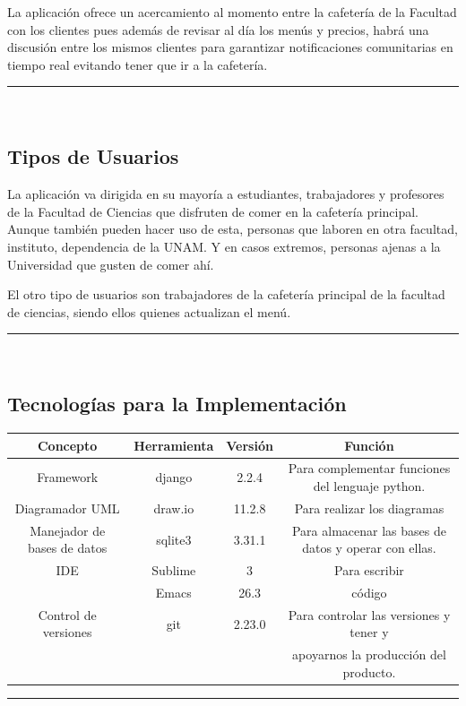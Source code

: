 \documentclass{article}
\begin{document}
La aplicación ofrece un acercamiento al momento entre la cafetería de la
Facultad con los clientes pues además de revisar al día los menús y precios,
habrá una discusión entre los mismos clientes para garantizar notificaciones
comunitarias en tiempo real evitando tener que ir a la cafetería.

\rule{0.8\textwidth}{.8pt}\\

\subsection*{Tipos de Usuarios}

La aplicación va dirigida en su mayoría a estudiantes, trabajadores y profesores
de la Facultad de Ciencias que disfruten de comer en la cafetería principal.
Aunque también pueden hacer uso de esta, personas que laboren en otra facultad,
instituto, dependencia de la UNAM. Y en casos extremos, personas ajenas a la
Universidad que gusten de comer ahí. 

El otro tipo de usuarios son trabajadores de la cafetería principal de la
facultad de ciencias, siendo ellos quienes actualizan el menú.

\rule{0.8\textwidth}{.8pt}\\

\subsection*{Tecnologías para la Implementación}

\begin{center}
  \begin{tabular}{| c | c | c | c | } \hline
    Concepto & Herramienta & Versión & Función \\\hline
    Framework & django & 2.2.4 & Para complementar funciones del lenguaje python. \\\hline
    Diagramador UML & draw.io & 11.2.8 &  Para realizar los diagramas \\\hline
    Manejador de bases de datos & sqlite3 & 3.31.1 & Para almacenar las bases de
    datos y operar con ellas. \\\hline
    IDE & Sublime & 3 & Para escribir \\
    & Emacs & 26.3 & código \\\hline
    Control de versiones & git & 2.23.0 & Para controlar las versiones y tener y \\
    & & & apoyarnos la producción del producto. \\ \hline
  \end{tabular}
\end{center}

\rule{0.8\textwidth}{.8pt}\\
\end{document}
